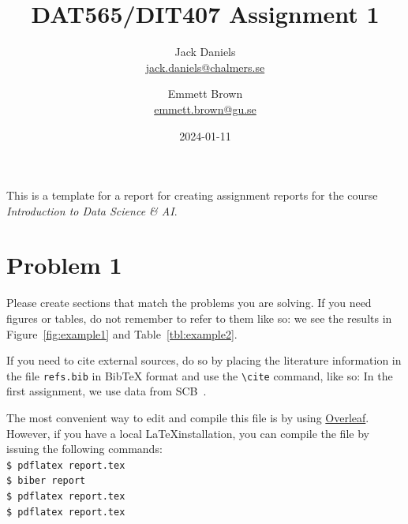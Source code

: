 \documentclass[a4paper]{article}
\begin{document}
\author{Jack Daniels \\
  \href{mailto:jack.daniels@chalmers.se}{jack.daniels@chalmers.se}
  \and
  Emmett Brown \\
  \href{mailto:emmett.brown@gu.se}{emmett.brown@gu.se}
}
\title{DAT565/DIT407 Assignment 1}
\date{2024-01-11}

\maketitle

This is a template for a report for creating assignment reports for
the course \emph{Introduction to Data Science \& AI}.

\section*{Problem 1}

Please create sections that match the problems you are solving. If you
need figures or tables, do not remember to refer to them like so: we
see the results in Figure~\ref{fig:example1} and
Table~\ref{tbl:example2}.

If you need to cite external sources, do so by placing the literature
information in the file \texttt{refs.bib} in BibTeX format and use the
\texttt{\textbackslash{}cite} command, like so: In the first
assignment, we use data from SCB~\cite{SCB:2023}.

The most convenient way to edit and compile this file is by using
\href{https://www.overleaf.com}{Overleaf}. However, if you have a
local \LaTeX installation, you can compile the file by issuing the
following commands:\\
\texttt{\$ pdflatex report.tex} \\
\texttt{\$ biber report} \\
\texttt{\$ pdflatex report.tex} \\
\texttt{\$ pdflatex report.tex} \\
\end{document}
